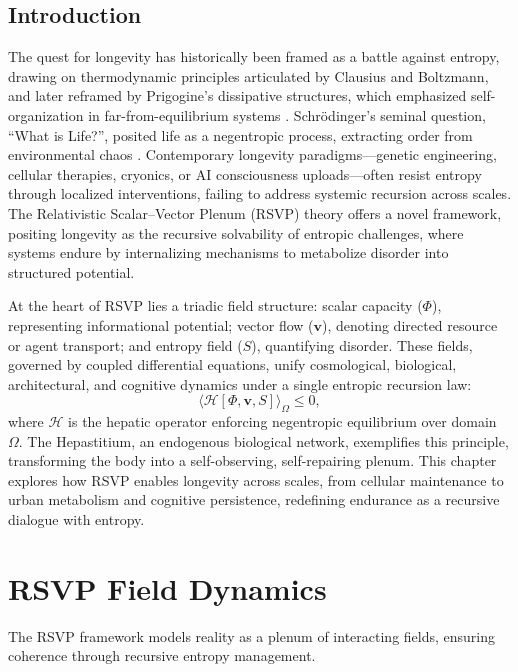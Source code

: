 \documentclass[12pt]{article}
\begin{document}
\subsection{Introduction}
\label{subsec:introduction}

The quest for longevity has historically been framed as a battle against entropy, drawing on thermodynamic principles articulated by Clausius and Boltzmann, and later reframed by Prigogine’s dissipative structures, which emphasized self-organization in far-from-equilibrium systems \cite{prigogine1977}. Schrödinger’s seminal question, “What is Life?”, posited life as a negentropic process, extracting order from environmental chaos \cite{schrodinger1944}. Contemporary longevity paradigms—genetic engineering, cellular therapies, cryonics, or AI consciousness uploads—often resist entropy through localized interventions, failing to address systemic recursion across scales. The Relativistic Scalar–Vector Plenum (RSVP) theory offers a novel framework, positing longevity as the recursive solvability of entropic challenges, where systems endure by internalizing mechanisms to metabolize disorder into structured potential.

At the heart of RSVP lies a triadic field structure: scalar capacity (\(\Phi\)), representing informational potential; vector flow (\(\mathbf{v}\)), denoting directed resource or agent transport; and entropy field (\(S\)), quantifying disorder. These fields, governed by coupled differential equations, unify cosmological, biological, architectural, and cognitive dynamics under a single entropic recursion law:
\begin{equation}
\langle \mathcal{H}[\Phi, \mathbf{v}, S] \rangle_\Omega \le 0,
\label{eq:hepatic_operator}
\end{equation}
where \(\mathcal{H}\) is the hepatic operator enforcing negentropic equilibrium over domain \(\Omega\). The Hepastitium, an endogenous biological network, exemplifies this principle, transforming the body into a self-observing, self-repairing plenum. This chapter explores how RSVP enables longevity across scales, from cellular maintenance to urban metabolism and cognitive persistence, redefining endurance as a recursive dialogue with entropy.

\section{RSVP Field Dynamics}
\label{sec:rsvp_dynamics}

The RSVP framework models reality as a plenum of interacting fields, ensuring coherence through recursive entropy management.
\end{document}
